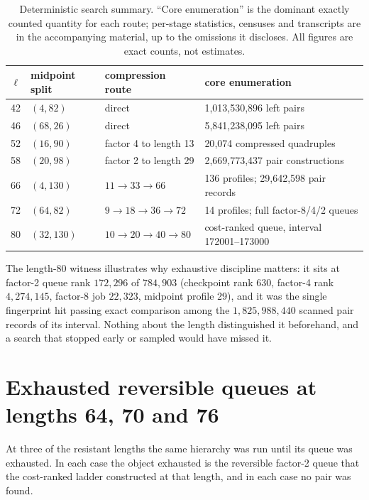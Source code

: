 \documentclass[11pt]{article}
\begin{document}
\begin{table}[t]
\centering
\small
\caption{Deterministic search summary.  ``Core enumeration'' is the dominant
exactly counted quantity for each route; per-stage statistics, censuses and
transcripts are in the accompanying material, up to the omissions it
discloses.  All figures are exact counts, not estimates.}
\label{tab:search}
\begin{tabular}{@{}rlll@{}}
\toprule
$\ell$ & midpoint split & compression route & core enumeration\\
\midrule
42 & $(4,82)$   & direct                    & 1{,}013{,}530{,}896 left pairs\\
46 & $(68,26)$  & direct                    & 5{,}841{,}238{,}095 left pairs\\
52 & $(16,90)$  & factor 4 to length 13     & 20{,}074 compressed quadruples\\
58 & $(20,98)$  & factor 2 to length 29     & 2{,}669{,}773{,}437 pair constructions\\
66 & $(4,130)$  & $11\to33\to66$            & 136 profiles; 29{,}642{,}598 pair records\\
72 & $(64,82)$  & $9\to18\to36\to72$        & 14 profiles; full factor-8/4/2 queues\\
80 & $(32,130)$ & $10\to20\to40\to80$       & cost-ranked queue, interval 172001--173000\\
\bottomrule
\end{tabular}
\end{table}

The length-80 witness illustrates why exhaustive discipline matters: it sits
at factor-2 queue rank $172{,}296$ of $784{,}903$ (checkpoint rank 630,
factor-4 rank $4{,}274{,}145$, factor-8 job $22{,}323$, midpoint profile 29),
and it was the single fingerprint hit passing exact comparison among the
$1{,}825{,}988{,}440$ scanned pair records of its interval.  Nothing about the
length distinguished it beforehand, and a search that stopped early or
sampled would have missed it.

\section{Exhausted reversible queues at lengths 64, 70 and 76}
\label{sec:terminals}

At three of the resistant lengths the same hierarchy was run until its queue
was exhausted.  In each case the object exhausted is the reversible factor-2
queue that the cost-ranked ladder constructed at that length, and in each case
no pair was found.
\end{document}
